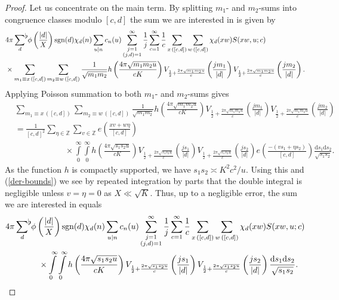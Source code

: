 \documentclass[a4paper,10pt,twoside]{amsart}
\theoremstyle{definition}
\numberwithin{equation}{section}
\newcommand\Z{\mathbb{Z}}
\renewcommand\:{\colon}
\newcommand{\sumflat}{\mathop{{\sum}^{\raisebox{-3pt}{\makebox[0pt][l]{$\flat$}}}}}
\begin{document}
\begin{proof}
Let us concentrate on the main term. By splitting $m_1$- and $m_2$-sums into congruence classes modulo $[c,d]$ the sum we are interested in is given by 
\begin{align*}
&4\pi \sumflat_d\,\phi\left(\frac{|d|}X\right)\text{sgn}(d)\chi_d(n)\sum_{u|n}c_n(u)\sum_{\substack{j=1\\(j,d)=1}}^\infty\frac1j\sum_{c=1}^\infty\frac1c\sum_{x\,([c,d])}\sum_{w\,([c,d])}\chi_d(xw)S(xw,u;c)\\
&\times\sum_{m_1\equiv x\,([c,d])}\sum_{m_2\equiv w\,([c,d])}\frac1{\sqrt{m_1m_2}}h\left(\frac{4\pi\sqrt{m_1m_2u}}{cK}\right)V_{\frac12+\frac{2\pi\sqrt{m_1m_2u}}{c}}\left(\frac{jm_1}{|d|}\right)V_{\frac12+\frac{2\pi\sqrt{m_1m_2u}}{c}}\left(\frac{jm_2}{|d|}\right).
\end{align*}
Applying Poisson summation to both $m_1$- and $m_2$-sums gives
\begin{align*}
&\sum_{m_1\equiv x\,([c,d])}\sum_{m_2\equiv w\,([c,d])}\frac1{\sqrt{m_1m_2}}h\left(\frac{4\pi\sqrt{m_1m_2u}}{cK}\right)V_{\frac12+\frac{2\pi\sqrt{m_1m_2u}}{c}}\left(\frac{jm_1}{|d|}\right)V_{\frac12+\frac{2\pi\sqrt{m_1m_2u}}{c}}\left(\frac{jm_2}{|d|}\right)\\
&=\frac1{[c,d]^2}\sum_{\eta\in\Z}\sum_{v\in\Z} e\left(\frac{xv+w\eta}{[c,d]}\right)\\
&\qquad\qquad\qquad\times\int\limits_0^\infty\int\limits_0^\infty h\left(\frac{4\pi\sqrt{s_1s_2u}}{cK}\right)V_{\frac12+\frac{2\pi\sqrt{s_1s_2u}}{c}}\left(\frac{js_1}{|d|}\right)V_{\frac12+\frac{2\pi\sqrt{s_1s_2u}}{c}}\left(\frac{js_2}{|d|}\right)e\left(\frac{-(vs_1+\eta s_2)}{[c,d]}\right)\frac{\mathrm d s_1 \mathrm d s_2}{\sqrt{s_1s_2}}.
\end{align*}
As the function $h$ is compactly supported, we have $s_1s_2\asymp K^2c^2/u$. Using this and (\ref{der-bounds}) we see by repeated integration by parts that the double integral is negligible unless $v=\eta=0$ as $X\ll\sqrt K$. Thus, up to a negligible error, the sum we are interested in equals
\begin{align*}
&4\pi \sumflat_d\,\phi\left(\frac{|d|}X\right)\text{sgn}(d)\chi_d(n)\sum_{u|n}c_n(u)\sum_{\substack{j=1\\(j,d)=1}}^\infty\frac1j\sum_{c=1}^\infty\frac1c\sum_{x\,([c,d])}\sum_{w\,([c,d])}\chi_d(xw)S(xw,u;c)\\
&\qquad\qquad\times\int\limits_0^\infty\int\limits_0^\infty h\left(\frac{4\pi\sqrt{s_1s_2u}}{cK}\right)V_{\frac12+\frac{2\pi\sqrt{s_1s_2u}}{c}}\left(\frac{js_1}{|d|}\right)V_{\frac12+\frac{2\pi\sqrt{s_1s_2u}}{c}}\left(\frac{js_2}{|d|}\right)\frac{\mathrm d s_1 \mathrm d s_2}{\sqrt{s_1s_2}}.

\end{align*}
\end{proof}
\end{document}
